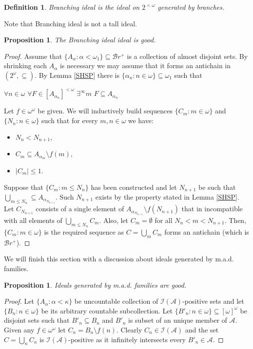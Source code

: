 \documentclass[a4paper]{amsart}
\newtheorem{proposition}[theorem]{Proposition}
\newtheorem{definition}[theorem]{Definition}
\newcommand{\Baire}{\omega^{\omega}}
\newcommand{\Cantor}{2^{\omega}}
\newcommand{\cantor}{2^{<\omega}}
\newcommand{\Br}{\mathcal{B}r}
\begin{document}
\begin{definition}
    Branching ideal is the ideal on $\cantor$ generated by branches.
\end{definition}
Note that Branching ideal is not a tall ideal.
\begin{proposition}
    The Branching ideal ideal is good.
\end{proposition}
\begin{proof}
    Assume that $\{A_{\alpha}:\alpha<\omega_{1}\}\subseteq\Br^{+}$ is a collection of almost disjoint sets. By shrinking each $A_{\alpha}$ is necessary we may assume that it forms an antichain in $(\Cantor,\subseteq)$. By Lemma \ref{SHSP} there is $\{\alpha_{n}:n\in\omega\}\subseteq\omega_{1}$ such that
    \begin{center}
        $\forall n\in\omega$ $\forall F\in [A_{\alpha_{n}}]^{<\omega}$ $\exists^{\infty}m$ $F\subseteq A_{\alpha_{n}}$
    \end{center}
    Let $f\in\Baire$ be given. We will inductively build sequences $\{C_{m}:m\in\omega\}$ and $\{N_{n}:n\in\omega\}$ such that for every $m,n\in\omega$ we have:
    \begin{itemize}
        \item[1.] $N_{n}<N_{n+1}$,
        \item[2.] $C_{m}\subseteq A_{\alpha_{m}}\setminus f(m)$,
        \item[3.] $|C_{m}|\leq 1$.
    \end{itemize}
    Suppose that $\{C_{m}:m\leq N_{n}\}$ has been constructed and let $N_{n+1}$ be such that $\bigcup_{m\leq N_{n}}\subseteq A_{\alpha_{N_{n+1}}}$. Such $N_{n+1}$ exists by the property stated in Lemma \ref{SHSP}. Let $C_{N_{n+1}}$ consists of a single element of $A_{\alpha_{N_{n+1}}}\setminus f(N_{n+1})$ that in incompatible with all elements of $\bigcup_{m\leq N_{n}}C_{m}$. Also, let $C_{m}=\emptyset$ for all $N_{n}<m<N_{n+1}$. Then, $\{C_{m}:m\in\omega\}$ is the required sequence as $C=\bigcup_{m}C_{m}$ forms an antichain (which is $\Br^{+}$).
\end{proof}
We will finish this section with a discussion about ideals generated by m.a.d. families.
\begin{proposition}
    Ideals generated by m.a.d. families are good.
\end{proposition}
\begin{proof}
    Let $\{A_{\alpha}:\alpha<\kappa\}$ be uncountable collection of $\mathcal{I}(\mathcal{A})$-positive sets and let $\{B_{n}:n\in\omega\}$ be its arbitrary countable subcollection. Let $\{B'_{n}:n\in\omega\}\subseteq[\omega]^{\omega}$ be disjoint sets such that $B'_{n}\subseteq B_{n}$ and $B'_{n}$ is subset of an unique member of $\mathcal{A}$. Given any $f\in\Baire$ let $C_{n}=B_{n}\setminus f(n)$. Clearly $C_{n}\in\mathcal{I}(\mathcal{A})$ and the set $C=\bigcup_{n}C_{n}$ is $\mathcal{I}(\mathcal{A})$-positive as it infinitely intersects every $B'_{n}\in\mathcal{A}$.
\end{proof}
\end{document}

